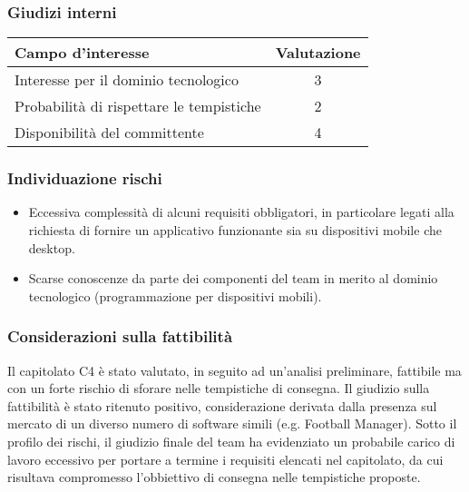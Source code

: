 \subsubsection{Giudizi interni}
\begin{center}
\begin{tabular}{lc}
\toprule
Campo d'interesse & Valutazione\\
\midrule %
Interesse per il dominio tecnologico & 3\\
Probabilità di rispettare le tempistiche & 2\\
Disponibilità del committente & 4\\
\bottomrule
\end{tabular}
\end{center}
\subsubsection{Individuazione rischi}
\begin{itemize}
	\item Eccessiva complessità di alcuni requisiti obbligatori, in particolare legati alla richiesta di fornire un applicativo funzionante sia su dispositivi mobile che desktop.
	\item Scarse conoscenze da parte dei componenti del team in merito al dominio tecnologico (programmazione per dispositivi mobili).
\end{itemize}
\subsubsection{Considerazioni sulla fattibilità}
Il capitolato C4 è stato valutato, in seguito ad un'analisi preliminare, fattibile ma con un forte rischio di sforare nelle tempistiche di consegna. Il giudizio sulla fattibilità è stato ritenuto positivo, considerazione derivata dalla presenza sul mercato di un diverso numero di software simili (e.g. Football Manager). Sotto il profilo dei rischi, il giudizio finale del team ha evidenziato un probabile carico di lavoro eccessivo per portare a termine i requisiti elencati nel capitolato, da cui risultava compromesso l'obbiettivo di consegna nelle tempistiche proposte.




